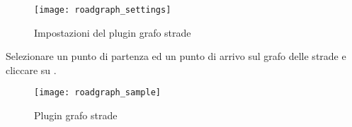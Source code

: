 \begin{figure}[ht]
    \centering
    \texttt{[image: roadgraph\_settings]}
    \caption{Impostazioni del plugin grafo strade \nixcaption}\label{fig:roadgraphsettings}
\end{figure}

Selezionare un punto di partenza ed un punto di arrivo sul grafo delle strade e cliccare su .

\begin{figure}[ht]
    \centering
    \texttt{[image: roadgraph\_sample]}
    \caption{Plugin grafo strade \nixcaption}\label{fig:roadgraphsample}
\end{figure}

\FloatBarrier